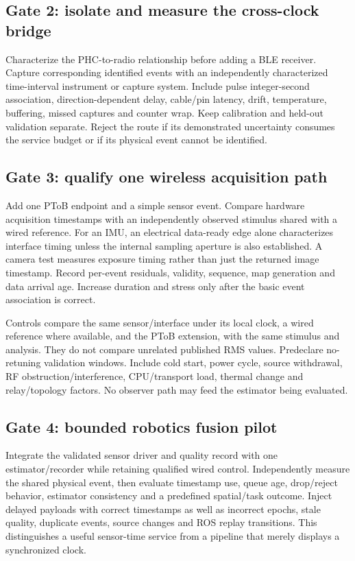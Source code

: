 \documentclass[11pt,letterpaper]{article}
\begin{document}
\subsection{Gate 2: isolate and measure the cross-clock bridge}
Characterize the PHC-to-radio relationship before adding a BLE receiver. Capture corresponding identified events with an independently characterized time-interval instrument or capture system. Include pulse integer-second association, direction-dependent delay, cable/pin latency, drift, temperature, buffering, missed captures and counter wrap. Keep calibration and held-out validation separate. Reject the route if its demonstrated uncertainty consumes the service budget or if its physical event cannot be identified.

\subsection{Gate 3: qualify one wireless acquisition path}
Add one PToB endpoint and a simple sensor event. Compare hardware acquisition timestamps with an independently observed stimulus shared with a wired reference. For an IMU, an electrical data-ready edge alone characterizes interface timing unless the internal sampling aperture is also established. A camera test measures exposure timing rather than just the returned image timestamp. Record per-event residuals, validity, sequence, map generation and data arrival age. Increase duration and stress only after the basic event association is correct.

Controls compare the same sensor/interface under its local clock, a wired reference where available, and the PToB extension, with the same stimulus and analysis. They do not compare unrelated published RMS values. Predeclare no-retuning validation windows. Include cold start, power cycle, source withdrawal, RF obstruction/interference, CPU/transport load, thermal change and relay/topology factors. No observer path may feed the estimator being evaluated.

\subsection{Gate 4: bounded robotics fusion pilot}
Integrate the validated sensor driver and quality record with one estimator/recorder while retaining qualified wired control. Independently measure the shared physical event, then evaluate timestamp use, queue age, drop/reject behavior, estimator consistency and a predefined spatial/task outcome. Inject delayed payloads with correct timestamps as well as incorrect epochs, stale quality, duplicate events, source changes and ROS replay transitions. This distinguishes a useful sensor-time service from a pipeline that merely displays a synchronized clock.
\end{document}
